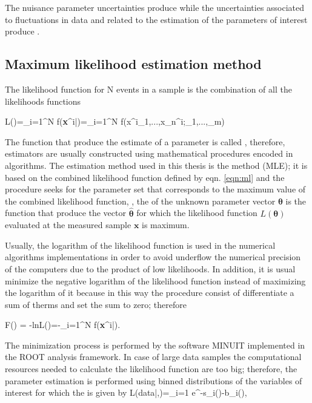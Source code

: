 The nuisance parameter uncertainties produce  while the uncertainties associated to fluctuations in data and related to the estimation of the parameters of interest produce .







\subsection{Maximum likelihood estimation method}

The likelihood function for N events in a sample is the combination of all the likelihoods functions

\beqn
L(\bm{\theta})=\prod_{i=1}^N f(\textbf{x}^i|\bm{\theta})=\prod_{i=1}^N f(x^i_1,...,x_n^i;\theta_1,...,\theta_m)\label{eqn:ml}
\eeqn




The function that produce the estimate of a parameter is called , therefore, estimators are usually constructed using mathematical procedures encoded in algorithms. The estimation method used in this thesis is the  method (MLE); it is based on the combined likelihood function defined by eqn. \ref{eqn:ml} and the procedure seeks for the parameter set that corresponds to the maximum value of the combined likelihood function, \ie, the  of the unknown parameter vector $\bm{\theta}$ is the function that produce the vector $\bm{\hat \theta}$ for which the likelihood function $L(\bm{\theta})$ evaluated at the measured sample $\textbf{x}$ is maximum.  

Usually, the logarithm of the likelihood function is used in the numerical algorithms implementations in order to avoid underflow the numerical precision of the computers due to the product of low likelihoods. In addition, it is usual minimize the negative logarithm of the likelihood function instead of maximizing the logarithm of it because in this way the procedure consist of differentiate a sum of therms and set the sum to zero; therefore

\beqn
F(\bm{\theta}) = -\textrm{ln}L(\bm{\theta})=-\sum_{i=1}^N f(\textbf{x}^i|\bm{\theta}).
\eeqn

The minimization process is performed by the software MINUIT \cite{minuit} implemented in the ROOT analysis framework. In case of large data samples the computational resources needed to calculate the likelihood function are too big; therefore, the parameter estimation is performed using binned distributions of the variables of interest for which the  is given by
\beqn
L(data|\mu,\theta)=\prod_{i=1}  e^{-\mu s_i(\theta)-b_i(\theta)},\label{eqn:bml}
\eeqn

